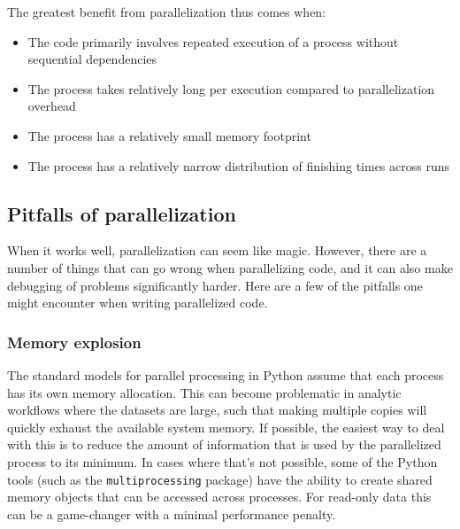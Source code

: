 The greatest benefit from parallelization thus comes when:

\begin{itemize}
\item The code primarily involves repeated execution of a process without sequential dependencies
\item The process takes relatively long per execution compared to parallelization overhead
\item The process has a relatively small memory footprint
\item The process has a relatively narrow distribution of finishing times across runs
\end{itemize}

\subsection{Pitfalls of parallelization}

When it works well, parallelization can seem like magic.  However, there are a number of things that can go wrong when parallelizing code, and it can also make debugging of problems significantly harder.  Here are a few of the pitfalls one might encounter when writing parallelized code.

\subsubsection{Memory explosion}

The standard models for parallel processing in Python assume that each process has its own memory allocation.  This can become problematic in analytic workflows where the datasets are large, such that making multiple copies will quickly exhaust the available system memory. If possible, the easiest way to deal with this is to reduce the amount of information that is used by the parallelized process to its minimum. In cases where that's not possible, some of the Python tools (such as the \texttt{multiprocessing} package) have the ability to create shared memory objects that can be accessed across processes.  For read-only data this can be a game-changer with a minimal performance penalty.


